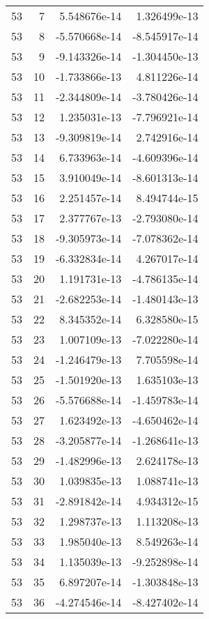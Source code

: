 \begin{tabular}{rrrr}
  53 &    7 &  5.548676e-14 &  1.326499e-13 \\
  53 &    8 & -5.570668e-14 & -8.545917e-14 \\
  53 &    9 & -9.143326e-14 & -1.304450e-13 \\
  53 &   10 & -1.733866e-13 &  4.811226e-14 \\
  53 &   11 & -2.344809e-14 & -3.780426e-14 \\
  53 &   12 &  1.235031e-13 & -7.796921e-14 \\
  53 &   13 & -9.309819e-14 &  2.742916e-14 \\
  53 &   14 &  6.733963e-14 & -4.609396e-14 \\
  53 &   15 &  3.910049e-14 & -8.601313e-14 \\
  53 &   16 &  2.251457e-14 &  8.494744e-15 \\
  53 &   17 &  2.377767e-13 & -2.793080e-14 \\
  53 &   18 & -9.305973e-14 & -7.078362e-14 \\
  53 &   19 & -6.332834e-14 &  4.267017e-14 \\
  53 &   20 &  1.191731e-13 & -4.786135e-14 \\
  53 &   21 & -2.682253e-14 & -1.480143e-13 \\
  53 &   22 &  8.345352e-14 &  6.328580e-15 \\
  53 &   23 &  1.007109e-13 & -7.022280e-14 \\
  53 &   24 & -1.246479e-13 &  7.705598e-14 \\
  53 &   25 & -1.501920e-13 &  1.635103e-13 \\
  53 &   26 & -5.576688e-14 & -1.459783e-14 \\
  53 &   27 &  1.623492e-13 & -4.650462e-14 \\
  53 &   28 & -3.205877e-14 & -1.268641e-13 \\
  53 &   29 & -1.482996e-13 &  2.624178e-13 \\
  53 &   30 &  1.039835e-13 &  1.088741e-13 \\
  53 &   31 & -2.891842e-14 &  4.934312e-15 \\
  53 &   32 &  1.298737e-13 &  1.113208e-13 \\
  53 &   33 &  1.985040e-13 &  8.549263e-14 \\
  53 &   34 &  1.135039e-13 & -9.252898e-14 \\
  53 &   35 &  6.897207e-14 & -1.303848e-13 \\
  53 &   36 & -4.274546e-14 & -8.427402e-14 \\

\end{tabular}
